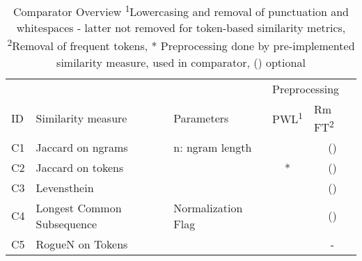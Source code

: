 \documentclass[11pt,titlepage,oneside,openany]{article}
\begin{document}
\begin{table}[!tbh]
	\small
	\begin{tabular}{lllcc}
		& \multicolumn{2}{l}{}                              & \multicolumn{2}{l}{Preprocessing}                   \\
		ID & Similarity   measure       & Parameters           & \multicolumn{1}{l}{PWL\textsuperscript{1}} & \multicolumn{1}{l}{Rm FT\textsuperscript{2}} \\\hline
		C1  & Jaccard on ngrams          & n: ngram   length    & \checked & (\checked)              \\
		C2  & Jaccard on tokens          &                      & *                       & (\checked)                       \\
		C3  & Levensthein                &                      & \checked & (\checked)                       \\
		C4  & Longest Common Subsequence & Normalization   Flag & \checked & (\checked)                       \\
		C5  & RogueN on Tokens \citep{lin_rouge_2004} & & \checked & -                      
	\end{tabular}
	
	\caption[Comparator Overview]%
	{Comparator Overview \small\medspace\medspace \textsuperscript{1}Lowercasing and removal of punctuation and whitespaces -  latter not removed for token-based similarity metrics, \textsuperscript{2}Removal of frequent tokens, * Preprocessing done by pre-implemented similarity measure, \checked \space used in comparator, (\checked) optional}
	\label{table:comparators}
	
\end{table}
\end{document}
